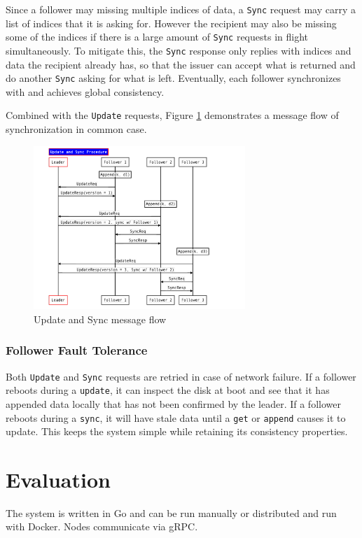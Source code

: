 \documentclass[11pt,english,twocolumn]{article}
\begin{document}
Since a follower may missing multiple indices of data, a \texttt{Sync} request
may carry a list of indices that it is asking for. However the recipient may
also be missing some of the indices if there is a large amount of \texttt{Sync}
requests in flight simultaneously. To mitigate this, the \texttt{Sync} response
only replies with indices and data the recipient already has, so that the
issuer can accept what is returned and do another \texttt{Sync} asking for
what is left. Eventually, each follower synchronizes with and achieves global
consistency.

Combined with the \texttt{Update} requests, Figure \ref{UpdateAndSync}
demonstrates a message flow of synchronization in common case.

\begin{figure}[h]
\includegraphics[width=8cm]{figure/UpdateAndSync.pdf}
\caption{Update and Sync message flow}
\label{UpdateAndSync}
\end{figure}

\subsubsection{Follower Fault Tolerance}
Both \texttt{Update} and \texttt{Sync} requests are retried in case of network
failure. If a follower reboots during a \texttt{update}, it can inspect the disk
at boot and see that it has appended data locally that has not been confirmed by
the leader. If a follower reboots during a \texttt{sync}, it will have stale
data until a \texttt{get} or \texttt{append} causes it to update. This keeps the
system simple while retaining its consistency properties.

\vspace{-0.4cm}
\section{Evaluation}
The system is written in Go and can be run manually or distributed and
run with Docker. Nodes communicate via gRPC. 
\end{document}
